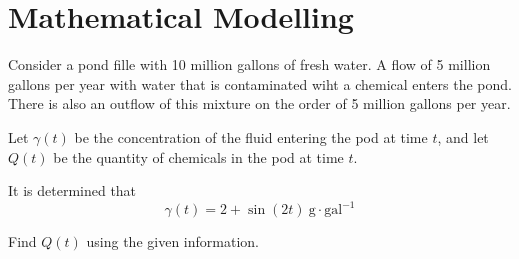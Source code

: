 \documentclass[twoside]{report}
\begin{document}
    \section{Mathematical Modelling}
    \begin{example}[Modelling]
        Consider a pond fille with 10 million gallons of fresh water. A flow of 5 million gallons per year with water that is contaminated wiht a chemical enters the pond. There is also an outflow of this mixture on the order of 5 million gallons per year.\bigskip

        \noindent Let $\gamma(t)$ be the concentration of the fluid entering the pod at time $t$, and let $Q(t)$ be the quantity of chemicals in the pod at time $t$.\bigskip
        
        \noindent It is determined that
        \[\gamma(t) = 2 + \sin(2t)\ \text{g}\cdot\text{gal}^{-1}\]

        \noindent Find $Q(t)$ using the given information.\bigskip


\end{example}
\end{document}

